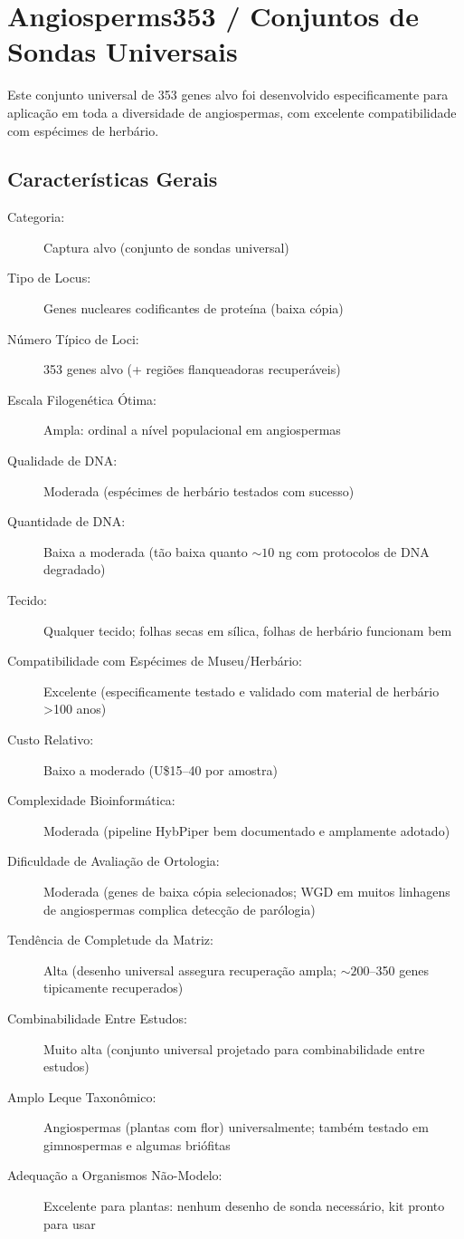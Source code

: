 \textcite{lemmon2012, prum2015, hime2021, breinholt2018}

\section{Angiosperms353 / Conjuntos de Sondas Universais}

Este conjunto universal de 353 genes alvo foi desenvolvido especificamente para aplicação em toda a diversidade de angiospermas, com excelente compatibilidade com espécimes de herbário.

\subsection{Características Gerais}

\begin{description}
\item[Categoria:] Captura alvo (conjunto de sondas universal)
\item[Tipo de Locus:] Genes nucleares codificantes de proteína (baixa cópia)
\item[Número Típico de Loci:] 353 genes alvo (+ regiões flanqueadoras recuperáveis)
\item[Escala Filogenética Ótima:] Ampla: ordinal a nível populacional em angiospermas
\item[Qualidade de DNA:] Moderada (espécimes de herbário testados com sucesso)
\item[Quantidade de DNA:] Baixa a moderada (tão baixa quanto \(\sim 10\) ng com protocolos de DNA degradado)
\item[Tecido:] Qualquer tecido; folhas secas em sílica, folhas de herbário funcionam bem
\item[Compatibilidade com Espécimes de Museu/Herbário:] Excelente (especificamente testado e validado com material de herbário >100 anos)
\item[Custo Relativo:] Baixo a moderado (U\$15--40 por amostra)
\item[Complexidade Bioinformática:] Moderada (pipeline HybPiper bem documentado e amplamente adotado)
\item[Dificuldade de Avaliação de Ortologia:] Moderada (genes de baixa cópia selecionados; WGD em muitos linhagens de angiospermas complica detecção de parólogia)
\item[Tendência de Completude da Matriz:] Alta (desenho universal assegura recuperação ampla; \(\sim 200\)--350 genes tipicamente recuperados)
\item[Combinabilidade Entre Estudos:] Muito alta (conjunto universal projetado para combinabilidade entre estudos)
\item[Amplo Leque Taxonômico:] Angiospermas (plantas com flor) universalmente; também testado em gimnospermas e algumas briófitas
\item[Adequação a Organismos Não-Modelo:] Excelente para plantas: nenhum desenho de sonda necessário, kit pronto para usar
\end{description}

